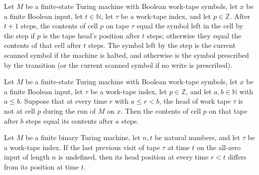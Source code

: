 \begin{lemma}
\label{Complexity.workCell_succ}
\leanok
{}
Let $M$ be a finite-state Turing machine with Boolean work-tape symbols, let $x$ be a
finite Boolean input, let $t\in\mathbb{N}$, let $\tau$ be a work-tape index, and let
$p\in\mathbb{Z}$. After $t+1$ steps, the contents of cell $p$ on tape $\tau$ equal the
symbol left in the cell by the step if $p$ is the tape head's position after $t$ steps;
otherwise they equal the contents of that cell after $t$ steps. The symbol left by the
step is the current scanned symbol if the machine is halted, and otherwise is the symbol
prescribed by the transition (or the current scanned symbol if no write is prescribed).
\end{lemma}

\begin{lemma}
\label{Complexity.workCell_eq_of_no_visit}
\leanok
{}
Let $M$ be a finite-state Turing machine with Boolean work-tape symbols, let $x$ be a
finite Boolean input, let $\tau$ be a work-tape index, let $p\in\mathbb{Z}$, and let
$a,b\in\mathbb{N}$ with $a\le b$. Suppose that at every time $r$ with $a\le r<b$, the
head of work tape $\tau$ is not at cell $p$ during the run of $M$ on $x$. Then the
contents of cell $p$ on that tape after $b$ steps equal its contents after $a$ steps.
\end{lemma}

\begin{lemma}
\label{Complexity.prevVisit_none_no_visit}
\leanok
{}
Let $M$ be a finite binary Turing machine, let $n,t$ be natural numbers, and let $\tau$
be a work-tape index. If the last previous visit of tape $\tau$ at time $t$ on the
all-zero input of length $n$ is undefined, then its head position at every time $r<t$
differs from its position at time $t$.
\end{lemma}

